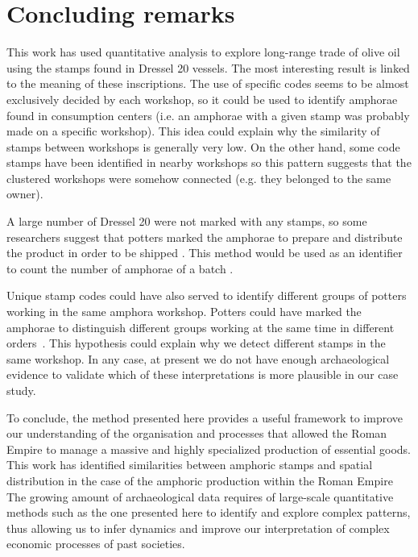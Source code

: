 \documentclass[review]{elsarticle}
\newcommand{\memo}[2]{\textcolor{#1}{#2}}
\newcommand{\xavi}[1]{\memo{magenta}{XRC: #1\\}}
\begin{document}
\section{Concluding remarks}

This work has used quantitative analysis to explore long-range trade of olive oil using the stamps found in Dressel 20 vessels. The most interesting result is linked to the meaning of these inscriptions. The use of specific codes seems to be almost exclusively decided by each workshop, so it could be used to identify amphorae found in consumption centers (i.e. an amphorae with a given stamp was probably made on a specific workshop). This idea could explain why the similarity of stamps between workshops is generally very low. On the other hand, some code stamps have been identified in nearby workshops so this pattern suggests that the clustered workshops were somehow connected (e.g. they belonged to the same owner).



A large number of Dressel 20 were not marked with any stamps, so some researchers suggest that potters marked the amphorae to prepare and distribute the product in order to be shipped \citep{berni_millet_epigrafianforica_2008}. This method would be used as an identifier to count the number of amphorae of a batch \citep{juanmorostesis}. 

Unique stamp codes could have also served to identify different groups of potters working in the same amphora workshop. Potters could have marked the amphorae to distinguish different groups working at the same time in different orders~\citep{li_crossbows_2014}. This hypothesis could explain why we detect different stamps in the same workshop. In any case, at present we do not have enough archaeological evidence to validate which of these interpretations is more plausible in our case study.

To conclude, the method presented here provides a useful framework to improve our understanding of the organisation and processes that allowed the Roman Empire to manage a massive and highly specialized production of essential goods. This work has identified similarities between amphoric stamps and spatial distribution in the case of the amphoric production within the Roman Empire
The growing amount of archaeological data requires of large-scale quantitative methods such as the one presented here to identify and explore complex patterns, thus allowing us to infer dynamics and improve our interpretation of complex economic processes of past societies. 
\end{document}

